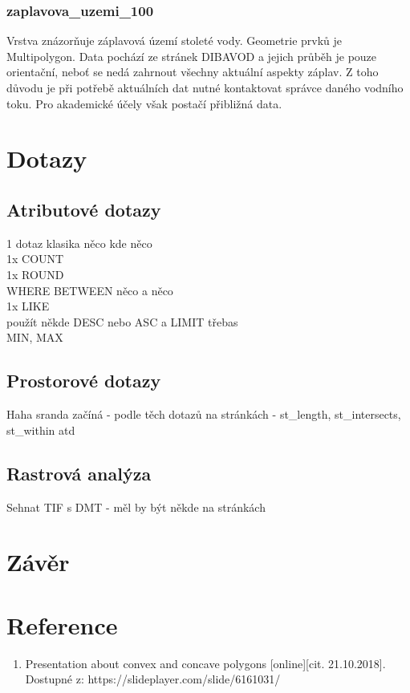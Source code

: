 \documentclass[a4paper, 12pt]{article}
\begin{document}
\subsubsection{zaplavova\_uzemi\_100}
Vrstva znázorňuje záplavová území stoleté vody. Geometrie prvků je Multipolygon. Data pochází ze stránek DIBAVOD a jejich průběh je pouze orientační, neboť se nedá zahrnout všechny aktuální aspekty záplav. Z toho důvodu je při potřebě aktuálních dat nutné kontaktovat správce daného vodního toku. Pro akademické účely však postačí přibližná data.

\section{Dotazy}

\subsection{Atributové dotazy}
1 dotaz klasika něco kde něco\\
1x COUNT\\
1x ROUND\\
WHERE BETWEEN něco a něco\\
1x LIKE\\
použít někde DESC nebo ASC  a LIMIT třebas\\
MIN, MAX\\


\subsection{Prostorové dotazy}
Haha sranda začíná - podle těch dotazů na stránkách - st\_length, st\_intersects, st\_within atd


\subsection{Rastrová analýza}
Sehnat TIF s DMT - měl by být někde na stránkách



\section{Závěr}

\clearpage
\section{Reference}

\begin{enumerate}
\item  Presentation about convex and concave polygons [online][cit. 21.10.2018]. \\
Dostupné z: https://slideplayer.com/slide/6161031/  \\


\end{enumerate}
\end{document}
